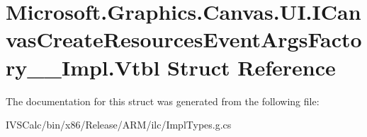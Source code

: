 \hypertarget{struct_microsoft_1_1_graphics_1_1_canvas_1_1_u_i_1_1_i_canvas_create_resources_event_args_factory_____impl_1_1_vtbl}{}\section{Microsoft.\+Graphics.\+Canvas.\+U\+I.\+I\+Canvas\+Create\+Resources\+Event\+Args\+Factory\+\_\+\+\_\+\+Impl.\+Vtbl Struct Reference}
\label{struct_microsoft_1_1_graphics_1_1_canvas_1_1_u_i_1_1_i_canvas_create_resources_event_args_factory_____impl_1_1_vtbl}


The documentation for this struct was generated from the following file\+:\begin{DoxyCompactItemize}
\item 
I\+V\+S\+Calc/bin/x86/\+Release/\+A\+R\+M/ilc/Impl\+Types.\+g.\+cs\end{DoxyCompactItemize}

